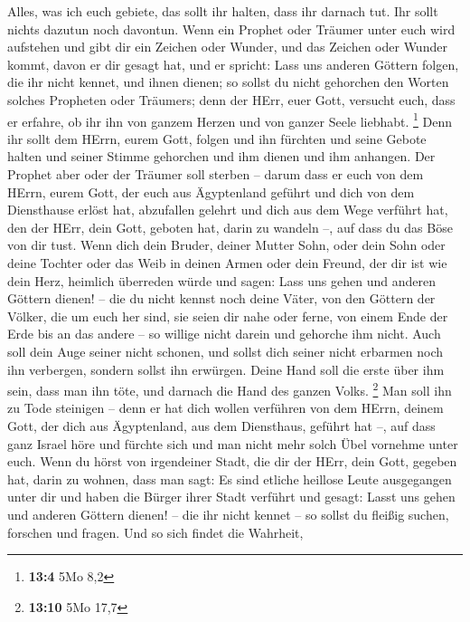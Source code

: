  Alles, was ich euch gebiete, das sollt ihr halten, dass
ihr darnach tut. Ihr sollt nichts dazutun noch davontun. 
Wenn ein Prophet oder Träumer unter euch wird aufstehen und gibt dir ein
Zeichen oder Wunder,  und das Zeichen oder Wunder kommt,
davon er dir gesagt hat, und er spricht: Lass uns anderen Göttern
folgen, die ihr nicht kennet, und ihnen dienen;  so sollst
du nicht gehorchen den Worten solches Propheten oder Träumers; denn der
HErr, euer Gott, versucht euch, dass er erfahre, ob ihr ihn von ganzem
Herzen und von ganzer Seele liebhabt. \footnote{\textbf{13:4} 5Mo 8,2}
 Denn ihr sollt dem HErrn, eurem Gott, folgen und ihn
fürchten und seine Gebote halten und seiner Stimme gehorchen und ihm
dienen und ihm anhangen.  Der Prophet aber oder der
Träumer soll sterben -- darum dass er euch von dem HErrn, eurem Gott,
der euch aus Ägyptenland geführt und dich von dem Diensthause erlöst
hat, abzufallen gelehrt und dich aus dem Wege verführt hat, den der
HErr, dein Gott, geboten hat, darin zu wandeln --, auf dass du das Böse
von dir tust.  Wenn dich dein Bruder, deiner Mutter Sohn,
oder dein Sohn oder deine Tochter oder das Weib in deinen Armen oder
dein Freund, der dir ist wie dein Herz, heimlich überreden würde und
sagen: Lass uns gehen und anderen Göttern dienen! -- die du nicht kennst
noch deine Väter,  von den Göttern der Völker, die um euch
her sind, sie seien dir nahe oder ferne, von einem Ende der Erde bis an
das andere --  so willige nicht darein und gehorche ihm
nicht. Auch soll dein Auge seiner nicht schonen, und sollst dich seiner
nicht erbarmen noch ihn verbergen,  sondern sollst ihn
erwürgen. Deine Hand soll die erste über ihm sein, dass man ihn töte,
und darnach die Hand des ganzen Volks. \footnote{\textbf{13:10} 5Mo 17,7}
 Man soll ihn zu Tode steinigen -- denn er hat dich
wollen verführen von dem HErrn, deinem Gott, der dich aus Ägyptenland,
aus dem Diensthaus, geführt hat --,  auf dass ganz Israel
höre und fürchte sich und man nicht mehr solch Übel vornehme unter euch.
 Wenn du hörst von irgendeiner Stadt, die dir der HErr,
dein Gott, gegeben hat, darin zu wohnen, dass man sagt: 
Es sind etliche heillose Leute ausgegangen unter dir und haben die
Bürger ihrer Stadt verführt und gesagt: Lasst uns gehen und anderen
Göttern dienen! -- die ihr nicht kennet --  so sollst du
fleißig suchen, forschen und fragen. Und so sich findet die Wahrheit,
